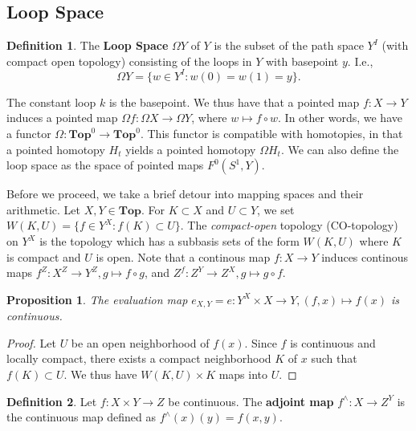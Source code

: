 \documentclass{article}
\newtheorem{prop}{Proposition}[section]
\theoremstyle{definition}
\newtheorem{defn}{Definition}[section]
\newcommand{\cat}{\mathbf}
\begin{document}
   \subsection{Loop Space}
   \begin{defn}
   The \textbf{Loop Space} $\Omega Y$ of $Y$ is the subset of the path space $Y^{I}$ (with compact open topology) consisting of the loops in $Y$ with basepoint $y$. I.e.,
   \[\Omega Y=\{w\in Y^{I}:w(0)=w(1)=y\}.\]
   \end{defn}
   The constant loop $k$ is the basepoint. We thus have that a pointed map $f:X\rightarrow Y$ induces a pointed map $\Omega f:\Omega X\rightarrow \Omega Y$, where $w\mapsto f\circ w$. In other words, we have a functor $\Omega:\cat{Top}^{0}\rightarrow\cat{Top}^{0}.$ This functor is compatible with homotopies, in that a pointed homotopy $H_{t}$ yields a pointed homotopy $\Omega H_{t}.$ We can also define the loop space as the space of pointed maps $F^{0}(S^{1},Y).$
   
   Before we proceed, we take a brief detour into mapping spaces and their arithmetic. Let $X,Y\in \cat{Top}.$ For $K\subset X$ and $U\subset Y$, we set $W(K,U)=\{f\in Y^{X}:f(K)\subset U\}.$ The \textit{compact-open} topology (CO-topology) on $Y^{X}$ is the topology which has a subbasis sets of the form $W(K,U)$ where $K$ is compact and $U$ is open. Note that a continous map $f:X\rightarrow Y$ induces continous maps $f^{Z}:X^{Z}\rightarrow Y^{Z},g\mapsto f\circ g$, and $Z^{f}:Z^{Y}\rightarrow Z^{X},g\mapsto g\circ f.$
   \begin{prop}
   The evaluation map $e_{X,Y}=e:Y^{X}\times X\rightarrow Y,(f,x)\mapsto f(x)$ is continuous. 
   \end{prop}
   \begin{proof}
   Let $U$ be an open neighborhood of $f(x).$ Since $f$ is continuous and locally compact, there exists a compact neighborhood $K$ of $x$ such that $f(K)\subset U$. We thus have $W(K,U)\times K$ maps into $U$.
   \end{proof}
   \begin{defn}
   Let $f:X\times Y\rightarrow Z$ be continuous. The \textbf{adjoint map} $f^{\wedge}:X\rightarrow Z^{Y}$ is the continuous map defined as $f^{\wedge}(x)(y)=f(x,y)$.  
   \end{defn}
   
\end{document}
